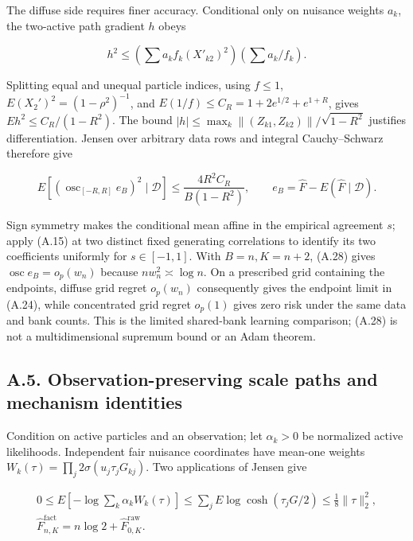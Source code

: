 \documentclass{article}
\begin{document}
The diffuse side requires finer accuracy. Conditional only on nuisance
weights \(a_k\), the two-active path gradient \(h\) obeys

\[
h^2\le(\sum a_kf_k(X'_{k2})^2)(\sum a_k/f_k).
\]

Splitting equal and unequal particle indices, using \(f\le1\),
\(E(X_2')^2=(1-\rho^2)^{-1}\), and \(E(1/f)\le C_R=1+2e^{1/2}+e^{1+R}\),
gives \(Eh^2\le C_R/(1-R^2)\). The bound
\(|h|\le\max_k\|(Z_{k1},Z_{k2})\|/\sqrt{1-R^2}\) justifies
differentiation. Jensen over arbitrary data rows and integral
Cauchy--Schwarz therefore give

\[
E[(\operatorname{osc}_{[-R,R]}e_B)^2\mid\mathcal D]
\le\frac{4R^2C_R}{B(1-R^2)},\qquad
e_B=\widehat F-E(\widehat F\mid\mathcal D).
\tag{A.28}
\]

Sign symmetry makes the conditional mean affine in the empirical
agreement \(s\); apply (A.15) at two distinct fixed generating
correlations to identify its two coefficients uniformly for
\(s\in[-1,1]\). With \(B=n,K=n+2\), (A.28) gives
\(\operatorname{osc}e_B=o_p(w_n)\) because \(nw_n^2\asymp\log n\). On a
prescribed grid containing the endpoints, diffuse grid regret
\(o_p(w_n)\) consequently gives the endpoint limit in (A.24), while
concentrated grid regret \(o_p(1)\) gives zero risk under the same data
and bank counts. This is the limited shared-bank learning comparison;
(A.28) is not a multidimensional supremum bound or an Adam theorem.

\subsection*{A.5. Observation-preserving scale paths and mechanism
identities}\label{a.5.-observation-preserving-scale-paths-and-mechanism-identities}

Condition on active particles and an observation; let \(\alpha_k>0\) be
normalized active likelihoods. Independent fair nuisance coordinates
have mean-one weights \(W_k(\tau)=\prod_j2\sigma(u_j\tau_jG_{kj})\). Two
applications of Jensen give

\[
\begin{gathered}
0\le E[-\log\sum_k\alpha_kW_k(\tau)]
\le\sum_jE\log\cosh(\tau_jG/2)\le\frac18\|\tau\|_2^2,\\
\widehat F^{\mathrm{fact}}_{n,K}=n\log2+\widehat F^{\mathrm{raw}}_{0,K}.
\end{gathered}
\tag{A.29}
\]
\end{document}

